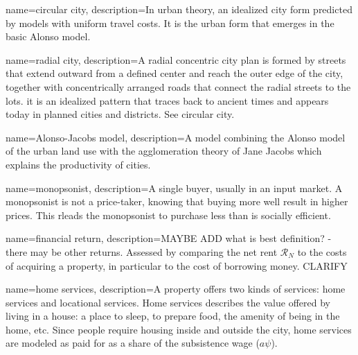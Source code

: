 {
name=circular city,
description={In urban theory, an idealized city form predicted by models with uniform travel costs. It is the urban form that emerges in the basic \gls{Alonso model}. %
}
}

{
name=radial city,
description={A radial concentric city plan is formed by streets that extend outward from a defined center and reach the outer edge of the city, together with concentrically arranged roads that connect the radial streets to the lots. it is an idealized pattern that traces back to ancient times and appears  today in planned cities and districts. See \gls{circular city}.}
}


{
name=Alonso-Jacobs model,
description={A model combining the \gls{Alonso model} of the urban land use  \cite{alonsoModelUrbanLand1960} with the \gls{agglomeration} theory of Jane Jacobs \cite{jacobsEconomyCities1969} which explains the productivity of cities.}
}

{
name=monopsonist,
description={A single buyer, usually in an input market. A monopsonist is not a price-taker, knowing that buying more well result in  higher prices. This rleads the monopsonist to purchase less than is socially efficient.}
}

{
name=financial return,
description={MAYBE ADD what is best definition? - there may be other returns. Assessed by comparing the net rent $\mathcal{R}_N$ to the costs of acquiring a property, in particular to the cost of borrowing money. CLARIFY}
}

{
name=home services,
description={A property offers two kinds of services: home services and \gls{locational services}. Home services describes the value offered by living in a house: a place to sleep, to prepare food, the amenity of being in the home, etc. Since people require housing inside and outside the city, home services are modeled as paid for as a share of the subsistence wage ($a \psi$).}
}

